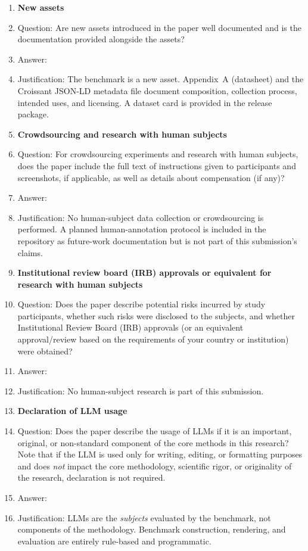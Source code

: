 \documentclass{article}
\begin{document}
\begin{enumerate}
\item {\bf New assets}
    \item[] Question: Are new assets introduced in the paper well documented and is the documentation provided alongside the assets?
    \item[] Answer: \answerYes{}
    \item[] Justification: The benchmark is a new asset. Appendix~A (datasheet) and the Croissant JSON-LD metadata file document composition, collection process, intended uses, and licensing. A dataset card is provided in the release package.

\item {\bf Crowdsourcing and research with human subjects}
    \item[] Question: For crowdsourcing experiments and research with human subjects, does the paper include the full text of instructions given to participants and screenshots, if applicable, as well as details about compensation (if any)?
    \item[] Answer: \answerNA{}
    \item[] Justification: No human-subject data collection or crowdsourcing is performed. A planned human-annotation protocol is included in the repository as future-work documentation but is not part of this submission's claims.

\item {\bf Institutional review board (IRB) approvals or equivalent for research with human subjects}
    \item[] Question: Does the paper describe potential risks incurred by study participants, whether such risks were disclosed to the subjects, and whether Institutional Review Board (IRB) approvals (or an equivalent approval/review based on the requirements of your country or institution) were obtained?
    \item[] Answer: \answerNA{}
    \item[] Justification: No human-subject research is part of this submission.

\item {\bf Declaration of LLM usage}
    \item[] Question: Does the paper describe the usage of LLMs if it is an important, original, or non-standard component of the core methods in this research? Note that if the LLM is used only for writing, editing, or formatting purposes and does \emph{not} impact the core methodology, scientific rigor, or originality of the research, declaration is not required.
    \item[] Answer: \answerNA{}
    \item[] Justification: LLMs are the \emph{subjects} evaluated by the benchmark, not components of the methodology. Benchmark construction, rendering, and evaluation are entirely rule-based and programmatic.

\end{enumerate}
\end{document}
